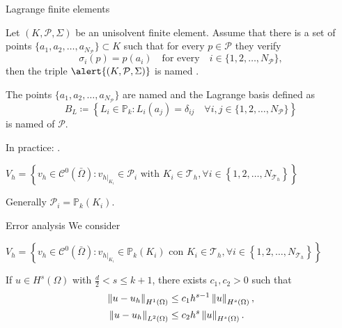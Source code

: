 \begin{frame}{Lagrange finite elements}
	\scriptsize
\begin{definicion}
	Let $\left(K,\mathcal{P},\Sigma\right)$ be an unisolvent finite element. Assume that there is a set of points $\{a_1,a_2,\ldots,a_{N_\mathcal{P}}\}\subset K$ such that for every $p\in\mathcal{P}$ they verify $$\sigma_i(p)=p(a_i)\quad\text{for every}\quad i\in\{1,2,\ldots,N_{\mathcal{P}}\},$$ then the triple $\alert{\left(K,\mathcal{P},\Sigma\right)}$ is named .
	
	The points $\{a_1,a_2,\ldots,a_{N_\mathcal{P}}\}$ are named  and the Lagrange basis defined as $$B_L\coloneqq\left\{L_i\in\mathbb{P}_k\colon L_i(a_j)=\delta_{ij}\quad\forall i,j\in\{1,2,\ldots,N_\mathcal{P}\} \right\}$$ is named  of $\mathcal{P}$.
\end{definicion}
In practice: .

\begin{block}{}
	\begin{center}
	$V_h=\left\{v_h\in \mathcal{C}^0\left(\bar\Omega\right)\colon v_{h|_{K_i}}\in \mathcal{P}_i \text{ with } K_i\in\mathcal{T}_h, \forall i\in\left\{1,2,\ldots,N_{\mathcal{T}_h} \right\}\right\}$
	\end{center}
	\end{block}
	
	
	Generally $\mathcal{P}_i=\mathbb{P}_k(K_i)$.
\end{frame}

\begin{frame}{Error analysis}
	We consider
	\begin{block}{}
		\begin{center}
		{\small $V_h=\left\{v_h\in \mathcal{C}^0\left(\bar\Omega\right)\colon v_{h|_{K_i}}\in \mathbb{P}_k(K_i) \text{ con } K_i\in\mathcal{T}_h, \forall i\in\left\{1,2,\ldots,N_{\mathcal{T}_h} \right\}\right\}$}
		\end{center}
	\end{block}

	\vspace*{1cm}
	\begin{theorem}
		If $u\in H^s(\Omega)$ with $\frac{d}{2}<s\le k+1$, there exists $c_1,c_2>0$ such that
		\begin{align*}
			\left\|u-u_h\right\|_{H^1(\Omega)}&\le c_1 h^{s-1}\left\|u\right\|_{H^s(\Omega)},\\
			\left\|u-u_h\right\|_{L^2(\Omega)}&\le c_2 h^{s}\left\|u\right\|_{H^s(\Omega)}.
		\end{align*}
	\end{theorem}
\end{frame}

